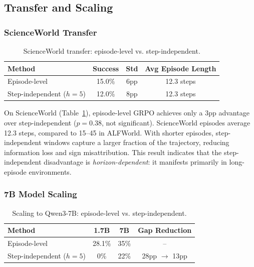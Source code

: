 \documentclass[11pt]{article}
\begin{document}
\subsection{Transfer and Scaling}

\subsubsection{ScienceWorld Transfer}

\begin{table}[h]
\centering
\caption{ScienceWorld transfer: episode-level vs. step-independent.}
\label{tab:scienceworld}
\begin{tabular}{lccc}
\toprule
Method & Success & Std & Avg Episode Length \\
\midrule
Episode-level         & 15.0\% & 6pp & 12.3 steps \\
Step-independent ($h{=}5$) & 12.0\% & 8pp & 12.3 steps \\
\bottomrule
\end{tabular}
\end{table}

On ScienceWorld (Table~\ref{tab:scienceworld}), episode-level GRPO achieves only a 3pp advantage over step-independent ($p = 0.38$, not significant).
ScienceWorld episodes average 12.3 steps, compared to 15--45 in ALFWorld.
With shorter episodes, step-independent windows capture a larger fraction of the trajectory, reducing information loss and sign misattribution.
This result indicates that the step-independent disadvantage is \emph{horizon-dependent}: it manifests primarily in long-episode environments.

\subsubsection{7B Model Scaling}

\begin{table}[h]
\centering
\caption{Scaling to Qwen3-7B: episode-level vs. step-independent.}
\label{tab:scaling}
\begin{tabular}{lccc}
\toprule
Method & 1.7B & 7B & Gap Reduction \\
\midrule
Episode-level            & 28.1\% & 35\% & -- \\
Step-independent ($h{=}5$) & 0\%    & 22\% & 28pp $\to$ 13pp \\
\bottomrule
\end{tabular}
\end{table}
\end{document}
